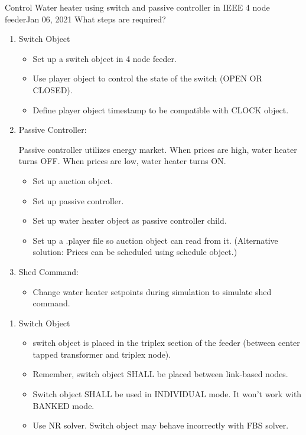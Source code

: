 \begin{entry}{Control Water heater using switch and passive controller in IEEE 4 node feeder}{Jan 06, 2021}
    What steps are required?
    \begin{enumerate}
        \item Switch Object
        \begin{itemize}
            \item Set up a switch object in 4 node feeder.
            \item Use player object to control the state of the switch (OPEN OR CLOSED).
            \item Define player object timestamp to be compatible with CLOCK object. 
        \end{itemize}
        \item Passive Controller:\par
        Passive controller utilizes energy market. When prices are high, water heater turns OFF. When prices are low, water heater turns ON.
        \begin{itemize}
            \item Set up auction object.
            \item Set up passive controller.
            \item Set up water heater object as passive controller child.
            \item Set up a .player file so auction object can read from it. (Alternative solution: Prices can be scheduled using schedule object.)
        \end{itemize}
        \item Shed Command:
        \begin{itemize}
            \item Change water heater setpoints during simulation to simulate shed command.
        \end{itemize}
    \end{enumerate}
    \procedures
    \begin{enumerate}
        \item Switch Object
        \begin{itemize}
            \item switch object is placed in the triplex section of the feeder (between center tapped transformer and triplex node).
            \item Remember, switch object SHALL be placed between link-based nodes. 
            \item Switch object SHALL be used in INDIVIDUAL mode. It won't work with BANKED mode.
            \item Use NR solver. Switch object may behave incorrectly with FBS solver.

\end{itemize}
\end{enumerate}
\end{entry}
